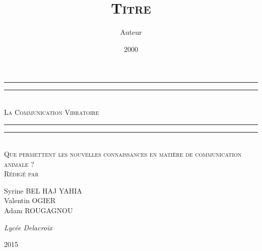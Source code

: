 \documentclass[11pt,a4paper,oneside,french]{report}
\title{\textsc{Titre}}
\author{Auteur}
\date{2000}
\begin{document}
	\begin{titlepage}
		\centering
		\vspace*{\baselineskip}
		\rule{\textwidth}{1.6pt}\vspace*{-\baselineskip}\vspace*{2pt}
		\rule{\textwidth}{0.4pt}\\[\baselineskip]
		{\LARGE\scshape La Communication Vibratoire}\\[0.2\baselineskip]
		\rule{\textwidth}{0.4pt}\vspace*{-\baselineskip}\vspace{3.2pt}
		\rule{\textwidth}{1.6pt}\\[\baselineskip]
		\scshape
		Que permettent les nouvelles connaissances en matière de communication animale ?\\
		\vspace*{2\baselineskip}
		Rédigé par \\[\baselineskip]
		{\Large Syrine BEL HAJ YAHIA \\ Valentin OGIER \\ Adam ROUGAGNOU\par}
		{\itshape Lycée Delacroix\par}
		\vfill
		{\scshape 2015} \\
		{\large}\par
	\end{titlepage}
	
	\thispagestyle{empty}
	\addtocounter{page}{-1}%
	\mbox{}
	
	\tableofcontents
	
	\setlength{\parskip}{2pt}%
	
	
	
	
	
	
	
	
	
	
	
	
\end{document}
